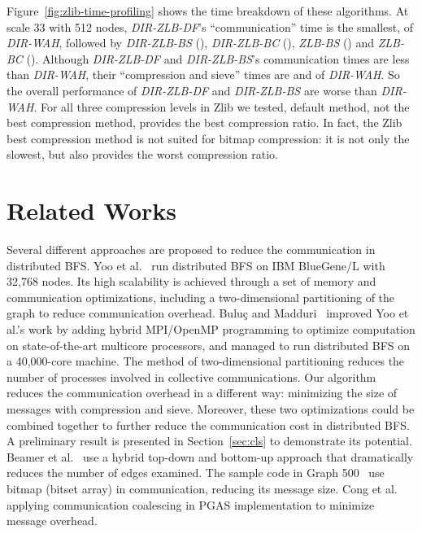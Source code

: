 \documentclass[conference]{IEEEtran}
\begin{document}
Figure~\ref{fig:zlib-time-profiling} shows the time breakdown of these
algorithms. At scale 33 with 512 nodes, \textit{DIR-ZLB-DF}'s
``communication'' time is the smallest,  of \textit{DIR-WAH},
followed by \textit{DIR-ZLB-BS} (), \textit{DIR-ZLB-BC}
(), \textit{ZLB-BS} () and \textit{ZLB-BC}
(). Although \textit{DIR-ZLB-DF} and \textit{DIR-ZLB-BS}'s
communication times are less than \textit{DIR-WAH}, their ``compression and
sieve'' times are  and  of \textit{DIR-WAH}. So the
overall performance of \textit{DIR-ZLB-DF} and \textit{DIR-ZLB-BS} are worse
than \textit{DIR-WAH}. For all three compression levels in Zlib we tested,
default method, not the best compression method, provides the best compression
ratio. In fact, the Zlib best compression method is not suited for bitmap
compression: it is not only the slowest, but also provides the worst
compression ratio.

\section{Related Works}
\label{sec:related}





Several different approaches are proposed to reduce the communication in
distributed BFS.  Yoo et al.~\cite{Yoo:2005} run distributed BFS on IBM
BlueGene/L with 32,768 nodes. Its high scalability is achieved through a set
of memory and communication optimizations, including a two-dimensional
partitioning of the graph to reduce communication overhead. Bulu\c{c} and
Madduri~\cite{Buluc:2011} improved Yoo et al.'s work by adding hybrid
MPI/OpenMP programming to optimize computation on state-of-the-art multicore
processors, and managed to run distributed BFS on a 40,000-core machine. 
The method of two-dimensional partitioning reduces the number of processes
involved in collective communications. Our algorithm reduces the communication
overhead in a different way: minimizing the size of messages with compression
and sieve. Moreover, these two optimizations could be combined together to
further reduce the communication cost in distributed BFS. A preliminary result
is presented in Section~\ref{sec:cls} to demonstrate its potential. Beamer et
al.~\cite{Beamer:EECS-2011-117} use a hybrid top-down and bottom-up approach
that dramatically reduces the number of edges examined. The sample code in
Graph 500~\cite{graph500} use bitmap (bitset array) in communication, reducing
its message size. Cong et al.~\cite{Cong:2010} applying communication
coalescing in PGAS implementation to minimize message overhead.  
\end{document}
